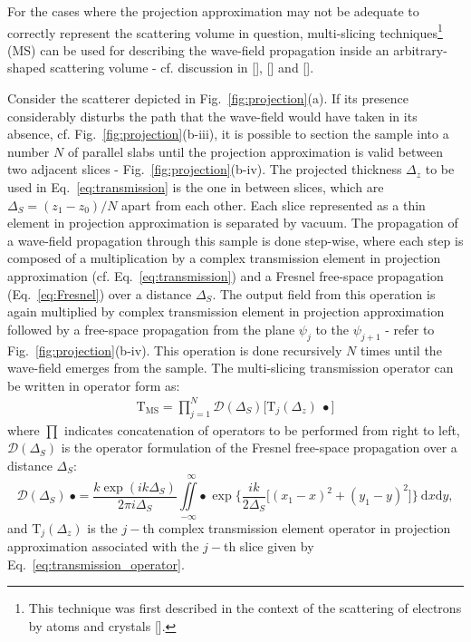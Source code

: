\begin{refsection}
For the cases where the projection approximation may not be adequate to correctly represent the scattering volume in question, multi-slicing techniques\footnote{This technique was first described in the context of the scattering of electrons by atoms and crystals [\cite{Cowley1957}].} (MS) can be used for describing the wave-field propagation inside an arbitrary-shaped scattering volume - cf. discussion in [\cite[\textit{§2.7}]{Paganin2006}], [\cite{Li2017}] and [\cite{Munro2019}].

Consider the scatterer depicted in Fig.~\ref{fig:projection}(a). If its presence considerably disturbs the path that the wave-field would have taken in its absence, cf. Fig.~\ref{fig:projection}(b-$\mathrm{iii}$), it is possible to section the sample into a number $N$ of parallel slabs until the projection approximation is valid between two adjacent slices - Fig.~\ref{fig:projection}(b-$\mathrm{iv}$). The projected thickness $\Delta_z$ to be used in Eq.~\ref{eq:transmission} is the one in  between slices, which are $\Delta_S=(z_1 - z_0)/N$ apart from each other. Each slice represented as a thin element in projection approximation is separated by vacuum. The propagation of a wave-field propagation through this sample is done step-wise, where each step is composed of a multiplication by a complex transmission element in projection approximation (cf. Eq.~\ref{eq:transmission}) and a Fresnel free-space propagation (Eq.~\ref{eq:Fresnel}) over a distance $\Delta_S$. The output field from this operation is again multiplied by complex transmission element in projection approximation followed by a free-space propagation from the plane $\psi_j$ to the  $\psi_{j+1}$ - refer to Fig.~\ref{fig:projection}(b-$\mathrm{iv}$). This operation is done recursively $N$ times until the wave-field emerges from the sample. The multi-slicing transmission operator can be written in operator form as:
\begin{align}\label{eq:MS}
    \mathrm{T}_\text{MS}=\prod\limits_{j=1}^{N}\mathcal{D}(\Delta_S)\big[\mathrm{T}_j(\Delta_z)~\bullet\big]
\end{align}{}
where $\prod$ indicates concatenation of operators to be performed from right to left, $\mathcal{D}(\Delta_S)$ is the operator formulation of the Fresnel free-space propagation over a distance $\Delta_S$:
\begin{equation}\label{eq:Fresnel_operator}
    \mathcal{D}(\Delta_S)~\bullet=\frac{k\exp{(ik\Delta_S)}}{2\pi i \Delta_S}\iint\limits_{-\infty}^{\hspace{8pt}\infty}{\bullet~\exp{\Bigg\{\frac{ik}{2\Delta_S}\big[(x_1-x)^2+(y_1-y)^2 \big]\Bigg\}}~\mathrm{d}x\mathrm{d}y},
\end{equation}
and $\mathrm{T}_j(\Delta_z)$ is the $j-$th complex transmission element operator in projection approximation associated with the $j-$th slice given by Eq.~\ref{eq:transmission_operator}.


\end{refsection}

